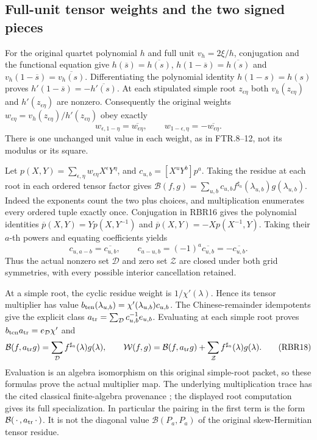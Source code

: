 \subsection{Full-unit tensor weights and the two signed pieces}

For the original quartet polynomial $h$ and full unit $v_h=2\xi/h$,
conjugation and the functional equation give
$h(\overline s)=\overline{h(s)}$,
$h(1-\overline s)=\overline{h(s)}$ and
$v_h(1-\overline s)=\overline{v_h(s)}$.
Differentiating the polynomial identity
$h(1-s)=h(s)$ proves
$h'(1-\overline s)=-\overline{h'(s)}$.
At each stipulated simple root $z_{\epsilon\eta}$ both
$v_h(z_{\epsilon\eta})$ and $h'(z_{\epsilon\eta})$ are nonzero.
Consequently the original weights
$w_{\epsilon\eta}=v_h(z_{\epsilon\eta})/h'(z_{\epsilon\eta})$
obey exactly
\[
 w_{\epsilon,1-\eta}=\overline{w_{\epsilon\eta}},
 \qquad
 w_{1-\epsilon,\eta}=-\overline{w_{\epsilon\eta}} .
 \tag{RBR16}
\]
There is one unchanged unit value in each weight, as in FTR.8--12,
not its modulus or its square.

Let $p(X,Y)=\sum_{\epsilon,\eta}w_{\epsilon\eta}X^\epsilon Y^\eta$,
and $c_{u,b}=[X^uY^b]p^a$. Taking the residue at each root in
each ordered tensor factor gives
$\mathcal B(f,g)=\sum_{u,b}c_{u,b}
f^{\sharp_a}(\lambda_{u,b})g(\lambda_{u,b})$.
Indeed the exponents count the two plus choices, and multiplication
enumerates every ordered tuple exactly once.
Conjugation in RBR16 gives the polynomial identities
$\overline p(X,Y)=Yp(X,Y^{-1})$ and
$\overline p(X,Y)=-Xp(X^{-1},Y)$.
Taking their $a$-th powers and equating coefficients yields
\[
 c_{u,a-b}=\overline{c_{u,b}},\qquad
 c_{a-u,b}=(-1)^a\overline{c_{u,b}}
                         =-\overline{c_{u,b}} .
 \tag{RBR17}
\]
Thus the actual nonzero set $\mathcal D$ and zero set $\mathcal Z$
are closed under both grid symmetries, with every possible
interior cancellation retained.

At a simple root, the cyclic residue weight is $1/\chi'(\lambda)$.
Hence its tensor multiplier has value
$b_{\rm ten}(\lambda_{u,b})=\chi'(\lambda_{u,b})c_{u,b}$.
The Chinese-remainder idempotents give the explicit class
$a_{\rm tr}=\sum_{\mathcal D}c_{u,b}^{-1}e_{u,b}$.
Evaluating at each simple root proves
$b_{\rm ten}a_{\rm tr}=e_{\mathcal D}\chi'$ and
\[
 \mathcal B(f,a_{\rm tr}g)
   =\sum_{\mathcal D}f^{\sharp_a}(\lambda)g(\lambda),
 \qquad
 \mathcal W(f,g)=\mathcal B(f,a_{\rm tr}g)
                   +\sum_{\mathcal Z}f^{\sharp_a}(\lambda)g(\lambda).
 \tag{RBR18}
\]
Evaluation is an algebra isomorphism on this original simple-root
packet, so these formulas prove the actual multiplier map.
The underlying multiplication trace has the cited classical
finite-algebra provenance \cite{human:stacks-trace}; the displayed
root computation gives its full specialization.
In particular the pairing in the first term is the form
$\mathcal B(\,\cdot\,,a_{\rm tr}\,\cdot\,)$.
It is not the diagonal value $\mathcal B(P_a,P_a)$ of the
original skew-Hermitian tensor residue.

